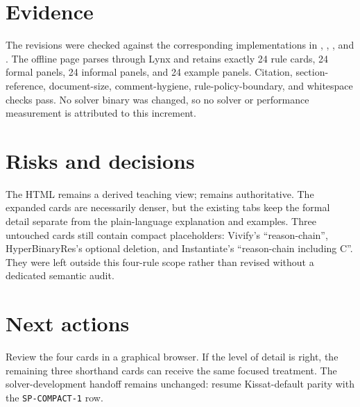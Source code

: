 \documentclass[11pt]{article}
\begin{document}
\section{Evidence}
The revisions were checked against the corresponding implementations in
, ,
, and .  The offline page parses
through Lynx and retains exactly 24 rule cards, 24 formal panels, 24 informal
panels, and 24 example panels.  Citation, section-reference, document-size,
comment-hygiene, rule-policy-boundary, and whitespace checks pass.  No solver
binary was changed, so no solver or performance measurement is attributed to
this increment.

\section{Risks and decisions}
The HTML remains a derived teaching view;  remains
authoritative.  The expanded cards are necessarily denser, but the existing
tabs keep the formal detail separate from the plain-language explanation and
examples.  Three untouched cards still contain compact placeholders:
Vivify's ``reason-chain'', HyperBinaryRes's optional deletion, and Instantiate's
``reason-chain including C''.  They were left outside this four-rule scope
rather than revised without a dedicated semantic audit.

\section{Next actions}
Review the four cards in a graphical browser.  If the level of detail is right,
the remaining three shorthand cards can receive the same focused treatment.
The solver-development handoff remains unchanged: resume Kissat-default parity
with the \texttt{SP-COMPACT-1} row.
\end{document}
